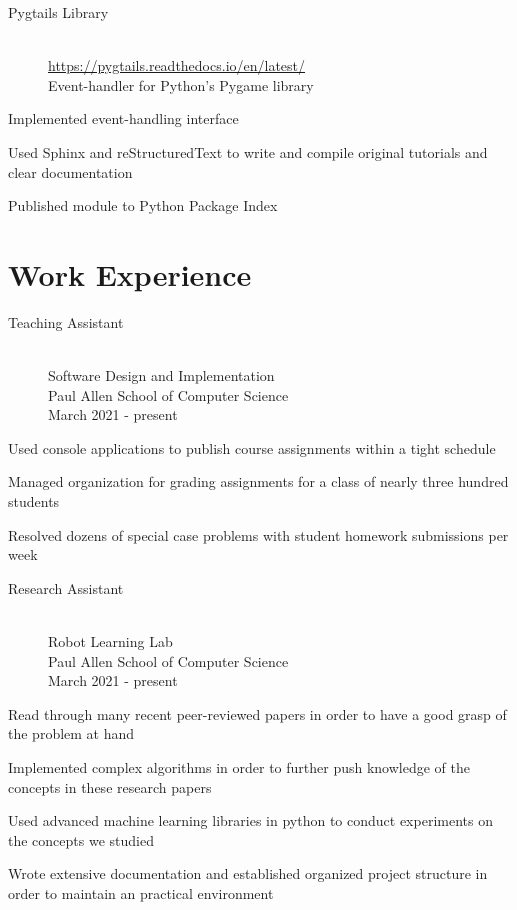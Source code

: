 \documentclass[10pt]{article}
\newenvironment{itemize*}
{\begin{itemize}[leftmargin=*]
    \setlength{\parskip}{0.5pt}}
{\end{itemize}}
\begin{document}
\begin{paracol}{2}
\begin{description}
\item[Pygtails Library] \hfill \\
    \url{https://pygtails.readthedocs.io/en/latest/}\\
    Event-handler for Python's Pygame library
\end{description}
\begin{itemize*}
\item Implemented event-handling interface
\item Used Sphinx and reStructuredText to write and compile original tutorials and clear
      documentation
\item Published module to Python Package Index
\end{itemize*}

\switchcolumn
\section*{Work Experience}

\begin{description}
\item[Teaching Assistant] \hfill \\
    Software Design and Implementation \\
    Paul Allen School of Computer Science \\
    March 2021 - present
\end{description}
\begin{itemize*}
\item Used console applications to publish course assignments within a tight schedule
\item Managed organization for grading assignments for a class of nearly three
      hundred students
\item Resolved dozens of special case problems with student homework
      submissions per week
\end{itemize*}

\begin{description}
\item[Research Assistant] \hfill \\
    Robot Learning Lab \\
    Paul Allen School of Computer Science \\
    March 2021 - present
\end{description}
\begin{itemize*}
\item Read through many recent peer-reviewed papers in order to have a good
      grasp of the problem at hand
\item Implemented complex algorithms in order to further push knowledge of the
      concepts in these research papers
\item Used advanced machine learning libraries in python to conduct experiments
      on the concepts we studied
\item Wrote extensive documentation and established organized project structure
      in order to maintain an practical environment
\end{itemize*}


\end{paracol}
\end{document}
